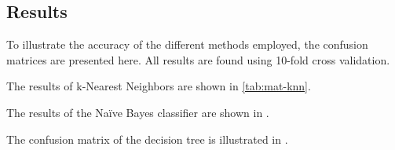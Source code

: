 \subsection{Results}
To illustrate the accuracy of the different methods employed, the confusion matrices are presented here. All results are found using 10-fold cross validation.

The results of k-Nearest Neighbors are shown in \ref{tab:mat-knn}.

\begin{table}[H]
	\centering
	\caption{Confusion matrix of the k-Nearest Neighbors classifier with Manhattan distance}
	\label{tab:mat-knn}
\end{table}

The results of the Na\"ive Bayes classifier are shown in .
\begin{table}[H]
	\centering
	\caption{Confusion matrix of the Na\"ive Bayes classifier}
	\label{tab:mat-nb}
\end{table}

The confusion matrix of the decision tree is illustrated in .
\begin{table}[H]
	\centering
	\caption{Confusion matrix of the decision tree}
	\label{tab:mat-tree}
\end{table}

